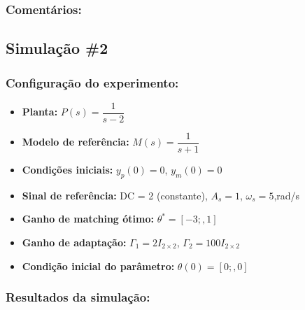 \documentclass[10pt]{article}
\begin{document}
\subsubsection{Comentários:}

\subsection{Simulação \#2}
\subsubsection{Configuração do experimento:}
\begin{itemize}
\item \textbf{Planta:} $P(s) = \dfrac{1}{s - 2}$
\item \textbf{Modelo de referência:} $M(s) = \dfrac{1}{s + 1}$
\item \textbf{Condições iniciais:} $y_p(0)=0$, $y_m(0)=0$
\item \textbf{Sinal de referência:} DC = 2 (constante), $A_s=1$, $\omega_s=5$,rad/s
\item \textbf{Ganho de matching ótimo:} $\theta^* = [-3;,1]$
\item \textbf{Ganho de adaptação:} $\Gamma_1 = 2I_{2\times2}$, $\Gamma_2 = 100 I_{2\times2}$
\item \textbf{Condição inicial do parâmetro:} $\theta(0) = [0;,0]$
\end{itemize}

\subsubsection{Resultados da simulação:}
\end{document}
